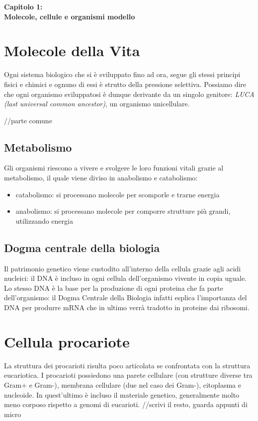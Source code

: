 \Large\textbf{Capitolo 1: \\Molecole, cellule e organismi modello}


\section{Molecole della Vita}
\small
Ogni sistema biologico che si è sviluppato fino ad ora, segue gli stessi principi fisici e chimici e ognuno di essi è strutto della pressione selettiva. Possiamo dire che ogni organismo sviluppatosi è dunque derivante da un singolo genitore: \textit{LUCA (last universal common ancestor)}, un organismo unicellulare.

//parte comune

\subsection{Metabolismo}
\small
Gli organismi riescono a vivere e svolgere le loro funzioni vitali grazie al metabolismo, il quale viene diviso in anabolismo e catabolismo:
\begin{itemize}
    \item catabolismo: si processano molecole per scomporle e trarne energia
    \item anabolismo: si processano molecole per comporre strutture più grandi, utilizzando energia
\end{itemize}

\subsection{Dogma centrale della biologia}
\small
Il patrimonio genetico viene custodito all'interno della cellula grazie agli acidi nucleici: il DNA è incluso in ogni cellula dell'organismo vivente in copia uguale. \\
Lo stesso DNA è la base per la produzione di ogni proteina che fa parte dell'organismo: il Dogma Centrale della Biologia infatti esplica l'importanza del DNA per produrre mRNA che in ultimo verrà tradotto in proteine dai ribosomi.


\section{Cellula procariote}
La struttura dei procarioti risulta poco articolata se confrontata con la struttura eucariotica. I procarioti possiedono una parete cellulare (con strutture diverse tra Gram+ e Gram-), membrana cellulare (due nel caso dei Gram-), citoplasma e nucleoide. In quest'ultimo è incluso il materiale genetico, generalmente molto meno corposo rispetto a genomi di eucarioti. 
//scrivi il resto, guarda appunti di micro

